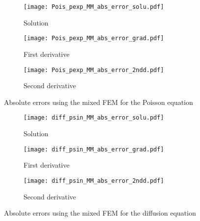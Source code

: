 \documentclass[final,3p]{elsarticle}
\begin{document}
\begin{figure}[!ht]
    \begin{subfigure}{5.5cm}
        \texttt{[image: Pois\_pexp\_MM\_abs\_error\_solu.pdf]}
        \caption{Solution}
        \label{Fig:Pois_pexp_MM_abs_error_solu}
    \end{subfigure}
    \begin{subfigure}{5.5cm}
        \texttt{[image: Pois\_pexp\_MM\_abs\_error\_grad.pdf]}
        \caption{First derivative}
        \label{Fig:Pois_pexp_MM_abs_error_grad}
    \end{subfigure}
    \begin{subfigure}{5.5cm}
        \texttt{[image: Pois\_pexp\_MM\_abs\_error\_2ndd.pdf]}
        \caption{Second derivative}
        \label{Fig:Pois_pexp_MM_abs_error_2ndd}
    \end{subfigure}
\caption{Absolute errors using the mixed FEM for the Poisson equation}
\label{Fig:Pois_pexp_MM_abs_error}
\end{figure}

\begin{figure}[!ht]
    \begin{subfigure}{5.5cm}
        \texttt{[image: diff\_psin\_MM\_abs\_error\_solu.pdf]}
        \caption{Solution}
        \label{Fig:diff_psin_MM_abs_error_solu}
    \end{subfigure}
    \begin{subfigure}{5.5cm}
        \texttt{[image: diff\_psin\_MM\_abs\_error\_grad.pdf]}
        \caption{First derivative}
        \label{Fig:diff_psin_MM_abs_error_grad}
    \end{subfigure}
    \begin{subfigure}{5.5cm}
        \texttt{[image: diff\_psin\_MM\_abs\_error\_2ndd.pdf]}
        \caption{Second derivative}
        \label{Fig:diff_psin_MM_abs_error_2ndd}
    \end{subfigure}
\caption{Absolute errors using the mixed FEM for the diffusion equation}
\label{Fig:diff_psin_MM_abs_error}    
\end{figure}   
\end{document}
